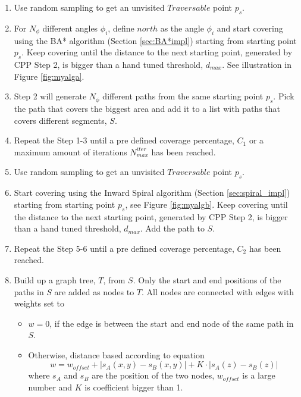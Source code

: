\begin{enumerate}
    \item Use random sampling to get an unvisited $Traversable$ point $p_s$.
    \item For $N_\phi$ different angles $\phi_i$, define $north$ as the angle $\phi_i$ and start covering using the BA* algorithm (Section \ref{sec:BA*impl}) starting from starting point $p_s$. Keep covering until the distance to the next starting point, generated by CPP Step 2, is bigger than a hand tuned threshold, $d_{max}$. See illustration in Figure \ref{fig:myalga}.
    \item Step 2 will generate $N_\phi$ different paths from the same starting point $p_s$. Pick the path that covers the biggest area and add it to a list with paths that covers different segments, $S$.
    \item Repeat the Step 1-3 until a pre defined coverage percentage, $C_1$ or a maximum amount of iterations $N^{iter}_{max}$ has been reached.
    \item Use random sampling to get an unvisited $Traversable$ point $p_s$.
    \item Start covering using the Inward Spiral algorithm (Section \ref{sec:spiral_impl}) starting from starting point $p_s$, see Figure \ref{fig:myalgb}. Keep covering until the distance to the next starting point, generated by CPP Step 2, is bigger than a hand tuned threshold, $d_{max}$. Add the path to $S$.
    \item Repeat the Step 5-6 until a pre defined coverage percentage, $C_2$ has been reached.
    \item Build up a graph tree, $T$, from $S$. Only the start and end positions of the paths in $S$ are added as nodes to $T$. All nodes are connected with edges with weights set to 
    \begin{itemize}
        \item $w=0$, if the edge is between the start and end node of the same path in $S$.
        \item Otherwise, distance based  according to equation 
            \begin{equation}
        \label{eq:distanebased}
            w = w_{offset} + | s_A(x,y) - s_B(x,y) | + K \cdot | s_A(z) - s_B(z) |
        \end{equation}
        where $s_A$ and $s_B$ are the position of the two nodes, $w_{offset}$ is a large number and $K$ is coefficient bigger than 1.
    \end{itemize}
    

\end{enumerate}
